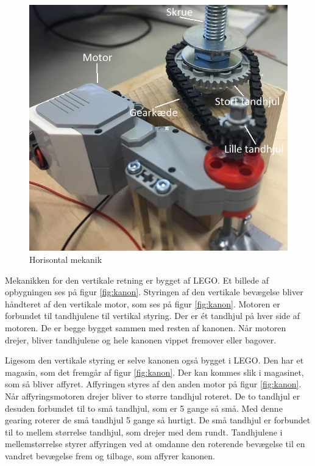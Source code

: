 \begin{figure}[H]
	\centering
	\includegraphics[width=1\textwidth]{Afsnit/DesignOgImplementering/images/horisontalMekanik}
	\caption{Horisontal mekanik}
	\label{fig:Horisontalmekanik}
\end{figure}

Mekanikken for den vertikale retning er bygget af LEGO. Et billede af opbygningen ses på figur \ref{fig:kanon}. Styringen af den vertikale bevægelse bliver håndteret af den vertikale motor, som ses på figur \ref{fig:kanon}. Motoren er forbundet til tandhjulene til vertikal styring. Der er ét tandhjul på hver side af motoren. De er begge bygget sammen med resten af kanonen. Når motoren drejer, bliver tandhjulene og hele kanonen vippet fremover eller bagover. 

Ligesom den vertikale styring er selve kanonen også bygget i LEGO. Den har et magasin, som det fremgår af figur \ref{fig:kanon}. Der kan kommes slik i magasinet, som så bliver affyret. Affyringen styres af den anden motor på figur \ref{fig:kanon}. Når affyringsmotoren drejer bliver to større tandhjul roteret. De to tandhjul er desuden forbundet til to små tandhjul, som er 5 gange så små. Med denne gearing roterer de små tandhjul 5 gange så hurtigt. De små tandhjul er forbundet til to mellem størrelse tandhjul, som drejer med dem rundt. Tandhjulene i mellemstørrelse styrer affyringen ved at omdanne den roterende bevægelse til en vandret bevægelse frem og tilbage, som affyrer kanonen.

